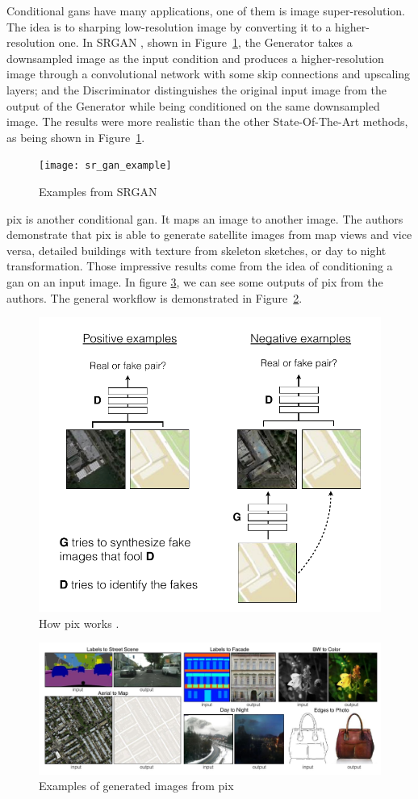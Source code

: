 Conditional \acrshort{gan}s have many applications, one of them is image super-resolution.
The idea is to sharping low-resolution image by converting it to a higher-resolution one.
In SRGAN \cite{sr_gan}, shown in Figure~\ref{fig:sr_gan_example}, the Generator takes a
downsampled image as the input condition and produces a higher-resolution image through a
convolutional network with some skip connections and upscaling layers; and the
Discriminator distinguishes the original input image from the output of the Generator
while being conditioned on the same downsampled image. The results were more realistic
than the other State-Of-The-Art methods, as being shown in
Figure~\ref{fig:sr_gan_example}.

\begin{figure}[h]
	\centering
	\texttt{[image: sr\_gan\_example]}
	\caption{Examples from SRGAN \cite{sr_gan}}
	\label{fig:sr_gan_example}
\end{figure}

\acrfull{pix} \cite{pix2pix} is another conditional \acrshort{gan}. It maps an image to
another image. The authors demonstrate that \acrshort{pix} is able to generate satellite
images from map views and vice versa, detailed buildings with texture from skeleton
sketches, or day to night transformation. Those impressive results come from the idea of
conditioning a \acrshort{gan} on an input image. In figure \ref{fig:pix2pix_examples}, we
can see some outputs of \acrshort{pix} from the authors.  The general workflow is
demonstrated in Figure~\ref{fig:pix2pix_workflow}.

\begin{figure}[h]
	\centering
	\includegraphics[width=0.5\linewidth]{img/pix2pix_workflow}
	\caption{How \acrshort{pix} works \cite{pix2pix}.}
	\label{fig:pix2pix_workflow}
\end{figure}


\begin{figure}[h]
	\centering
	\includegraphics[width=0.8\linewidth]{img/pix2pix_examples}
	\caption{Examples of generated images from \acrshort{pix} \cite{pix2pix} }
	\label{fig:pix2pix_examples}
\end{figure}

